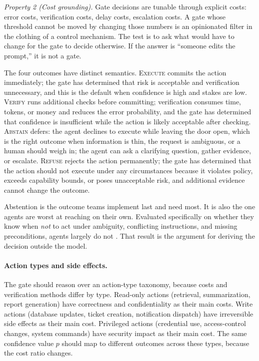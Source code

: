 \documentclass[11pt]{book}
\begin{document}
\textit{Property 2 (Cost grounding).} Gate decisions are tunable through explicit costs: error costs, verification costs, delay costs, escalation costs. A gate whose threshold cannot be moved by changing those numbers is an opinionated filter in the clothing of a control mechanism. The test is to ask what would have to change for the gate to decide otherwise. If the answer is ``someone edits the prompt,'' it is not a gate.

The four outcomes have distinct semantics. \textsc{Execute} commits the action immediately; the gate has determined that risk is acceptable and verification unnecessary, and this is the default when confidence is high and stakes are low. \textsc{Verify} runs additional checks before committing; verification consumes time, tokens, or money and reduces the error probability, and the gate has determined that confidence is insufficient while the action is likely acceptable after checking. \textsc{Abstain} defers: the agent declines to execute while leaving the door open, which is the right outcome when information is thin, the request is ambiguous, or a human should weigh in; the agent can ask a clarifying question, gather evidence, or escalate. \textsc{Refuse} rejects the action permanently; the gate has determined that the action should not execute under any circumstances because it violates policy, exceeds capability bounds, or poses unacceptable risk, and additional evidence cannot change the outcome.

Abstention is the outcome teams implement last and need most. It is also the one agents are worst at reaching on their own. Evaluated specifically on whether they know when \textit{not} to act under ambiguity, conflicting instructions, and missing preconditions, agents largely do not \cite{agentabstain2026}. That result is the argument for deriving the decision outside the model.

\paragraph{Action types and side effects.}
The gate should reason over an action-type taxonomy, because costs and verification methods differ by type. Read-only actions (retrieval, summarization, report generation) have correctness and confidentiality as their main costs. Write actions (database updates, ticket creation, notification dispatch) have irreversible side effects as their main cost. Privileged actions (credential use, access-control changes, system commands) have security impact as their main cost. The same confidence value $p$ should map to different outcomes across these types, because the cost ratio changes.
\end{document}
